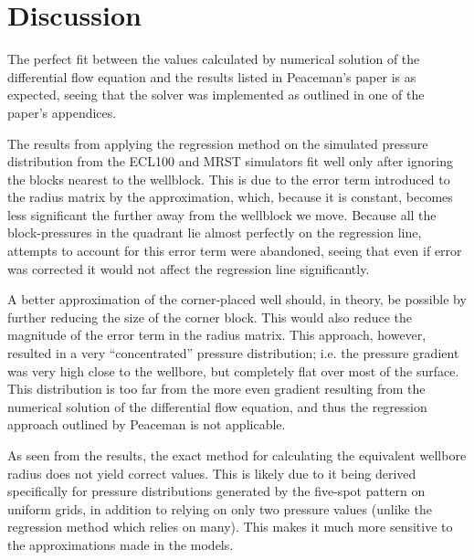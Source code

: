 \section{Discussion} %
\label{sec:discussion}
The perfect fit between the values calculated by numerical solution of the differential flow equation and the results listed in Peaceman's paper \cite{Peaceman1978Interpretation} is as expected, seeing that the solver was implemented as outlined in one of the paper's appendices.

The results from applying the regression method on the simulated pressure distribution from the ECL100 and MRST simulators fit well only after ignoring the blocks nearest to the wellblock. This is due to the error term introduced to the radius matrix by the approximation, which, because it is constant, becomes less significant the further away from the wellblock we move. Because all the block-pressures in the quadrant lie almost perfectly on the regression line, attempts to account for this error term were abandoned, seeing that even if error was corrected it would not affect the regression line significantly.

A better approximation of the corner-placed well should, in theory, be possible by further reducing the size of the corner block. This would also reduce the magnitude of the error term in the radius matrix. This approach, however, resulted in a very ``concentrated'' pressure distribution; i.e. the pressure gradient was very high  close to the wellbore, but completely flat over most of the surface. This distribution is too far from the more even gradient resulting from the numerical solution of the differential flow equation, and thus the regression approach outlined by Peaceman is not applicable.

As seen from the results, the exact method for calculating the equivalent wellbore radius does not yield correct values. This is likely due to it being derived specifically for pressure distributions generated by the five-spot pattern on uniform grids, in addition to relying on only two pressure values (unlike the regression method which relies on many). This makes it much more sensitive to the approximations made in the models.  
